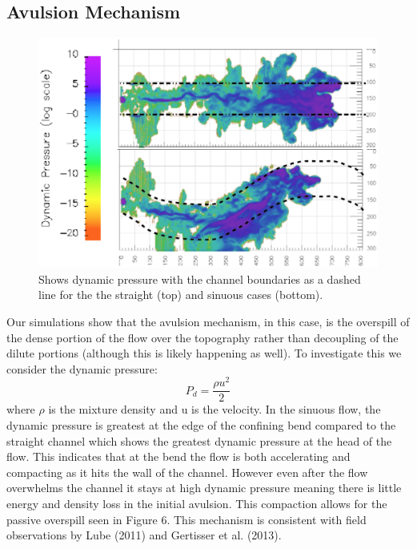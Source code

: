 \subsection{Avulsion Mechanism}
\begin{figure}[ht]
 \centering
 \includegraphics[width= \linewidth]{dpu.eps}
 \caption{ Shows dynamic pressure with the channel boundaries as a dashed line for the the straight (top) and sinuous cases (bottom). }
 \label{fig:dpu} 
\end{figure}
Our simulations show that the avulsion mechanism, in this case, is the overspill of the dense portion of the flow over the topography rather than decoupling of the dilute portions (although this is likely happening as well). To investigate this we consider the dynamic pressure:
\begin{equation}
    P_{d} = \frac{\rho u^{2}}{2}
\end{equation}
 where \(\rho\) is the mixture density and u is the velocity. In the sinuous flow, the dynamic pressure is greatest at the edge of the confining bend compared to the straight channel which shows the greatest dynamic pressure at the head of the flow. This indicates that at the bend the flow is both accelerating and compacting as it hits the wall of the channel. However even after the flow overwhelms the channel it stays at high dynamic pressure meaning there is little energy and density loss in the initial avulsion. This compaction allows for the passive overspill seen in Figure 6. This mechanism is consistent with field observations by Lube (2011) and Gertisser et al. (2013).



